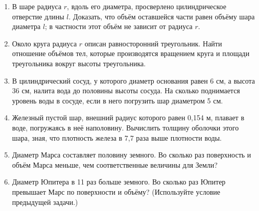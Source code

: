 \begin{enumerate}
\item
В шаре радиуса $r$, вдоль его диаметра, просверлено цилиндрическое отверстие длины $l$.
Доказать, что объём оставшейся части равен объёму шара диаметра $l$; в частности этот объём не зависит от радиуса $r$.

\item
Около круга радиуса $r$ описан равносторонний треугольник.
Найти отношение объёмов тел, которые производятся вращением круга и площади треугольника вокруг высоты треугольника.

\item
В цилиндрический сосуд, у которого диаметр основания равен 6 см, а высота 36 см, налита вода до половины высоты сосуда.
На сколько поднимается уровень воды в сосуде, если в него погрузить шар диаметром 5 см.

\item
Железный пустой шар, внешний радиус которого равен 0,154 м, плавает в воде, погружаясь в неё наполовину.
Вычислить толщину оболочки этого шара, зная, что плотность железа в 7,7 раза выше плотности воды.

\item
Диаметр Марса составляет половину земного.
Во сколько раз поверхность и объём Марса меньше, чем соответственные величины для Земли?

\item
Диаметр Юпитера в 11 раз больше земного.
Во сколько раз Юпитер превышает Марс по поверхности и объёму? (Используйте условие предыдущей задачи.)
\end{enumerate}
